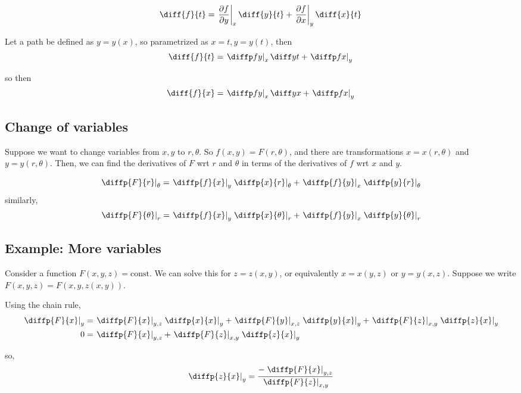 \documentclass[12pt]{article}
\begin{document}
\[\diff{f}{t} = \left.\frac{\partial f}{\partial y}\right|_{x} \diff{y}{t}
    + \left.\frac{\partial f}{\partial x}\right|_{y} \diff{x}{t}\]

Let a path be defined as $y = y(x)$, so parametrized as $x=t,y=y(t)$, then
\[\diff{f}{t} = \left.\diffp f y\right|_{x}\diff yt + \left.\diffp f x\right|_{y}\]

so then
\[\diff{f}{x} = \left.\diffp f y\right|_{x}\diff yx + \left.\diffp f x\right|_{y}\]


\subsection{Change of variables}
Suppose we want to change variables from $x,y$ to $r,\theta$.
So $f(x,y)=F(r,\theta )$, and there are transformations $x=x(r,\theta )$ and $y=y(r,\theta )$.
Then, we can find the derivatives of $F$ wrt $r$ and $\theta $ in terms of the
derivatives of $f$ wrt $x$ and $y$.

\[\left.\diffp{F}{r}\right|_{\theta } = \left.\diffp{f}{x}\right|_{y} 
            \left.\diffp{x}{r}\right|_{\theta } 
            + \left.\diffp{f}{y}\right|_{x} 
            \left.\diffp{y}{r}\right|_{\theta }
\]
similarly,
\[\left.\diffp{F}{\theta }\right|_{r } = \left.\diffp{f}{x}\right|_{y} 
            \left.\diffp{x}{\theta }\right|_{r } 
            + \left.\diffp{f}{y}\right|_{x} 
            \left.\diffp{y}{\theta }\right|_{r }
\]

\subsection{Example: More variables}
Consider a function $F(x,y,z) = \text{const}$.
We can solve this for $z = z(x,y)$,
or equivalently $x = x(y,z)$ or $y = y(x,z)$.
Suppose we write $F(x,y,z) = F(x,y,z(x,y))$.

Using the chain rule,
\[
    \begin{aligned}
    \left.\diffp{F}{x}\right|_{y} 
        &= \left.\diffp{F}{x}\right|_{y,z}\left.\diffp{x}{x}\right|_{y} 
        + \left.\diffp{F}{y}\right|_{x,z}\left.\diffp{y}{x}\right|_{y} 
        + \left.\diffp{F}{z}\right|_{x,y}\left.\diffp{z}{x}\right|_{y} \\
        0 &= \left.\diffp{F}{x}\right|_{y,z}
        + \left.\diffp{F}{z}\right|_{x,y}\left.\diffp{z}{x}\right|_{y} \\
    \end{aligned}
\]

so,
\[
    \left.\diffp{z}{x}\right|_{y} = \frac{-\left.\diffp{F}{x}\right|_{y,z}}{\left.\diffp{F}{z}\right|_{x,y}}
\]
\end{document}
